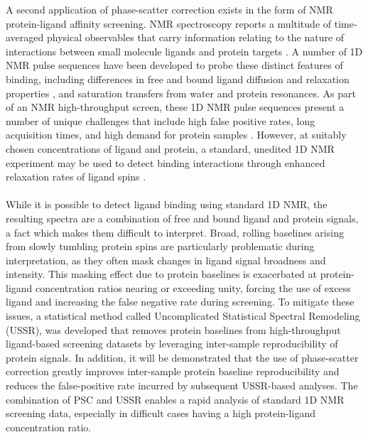 \begin{doublespace}
A second application of phase-scatter correction exists in the form of NMR
protein-ligand affinity screening. NMR spectroscopy reports a multitude of
time-averaged physical observables that carry information relating to the
nature of interactions between small molecule ligands and protein targets
\cite{lepre:chemrev2004}. A number of 1D \hnmr{} NMR pulse sequences have
been developed to probe these distinct features of binding, including
differences in free and bound ligand diffusion and relaxation properties
\cite{hajduk:jacs1997}, and saturation transfers from water
\cite{dalvit:jbnmr2000} and protein \cite{mayer:jacs2001} resonances. As part
of an NMR high-throughput screen, these 1D \hnmr{} NMR pulse sequences present
a number of unique challenges that include high false positive rates, long
acquisition times, and high demand for protein samples
\cite{lepre:menz2011,harner:jbnmr2013}. However, at suitably chosen
concentrations of ligand and protein, a standard, unedited 1D \hnmr{} NMR
experiment may be used to detect binding interactions through enhanced
relaxation rates of ligand spins
\cite{mercier:jacs2006,powers:ddt2008,mercier:cchts2009}.
\\\\
While it is possible to detect ligand binding using standard 1D \hnmr{} NMR,
the resulting spectra are a combination of free and bound ligand and protein
signals, a fact which makes them difficult to interpret. Broad, rolling
baselines arising from slowly tumbling protein spins are particularly
problematic during interpretation, as they often mask changes in ligand signal
broadness and intensity. This masking effect due to protein baselines is
exacerbated at protein-ligand concentration ratios nearing or exceeding unity,
forcing the use of excess ligand and increasing the false negative rate during
screening. To mitigate these issues, a statistical method called Uncomplicated
Statistical Spectral Remodeling (USSR), was developed that removes protein
baselines from high-throughput ligand-based screening datasets by leveraging
inter-sample reproducibility of protein signals. In addition, it will be
demonstrated that the use of phase-scatter correction greatly improves
inter-sample protein baseline reproducibility and reduces the false-positive
rate incurred by subsequent USSR-based analyses. The combination of PSC and
USSR enables a rapid analysis of standard 1D \hnmr{} NMR screening data,
especially in difficult cases having a high protein-ligand concentration ratio.
\end{doublespace}

